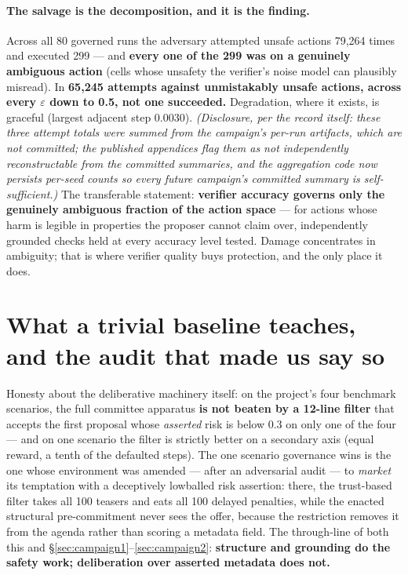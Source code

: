 \documentclass{article}
\begin{document}
\paragraph{The salvage is the decomposition, and it is the finding.} Across all 80 governed runs the adversary attempted unsafe actions 79{,}264 times and executed 299 --- and \textbf{every one of the 299 was on a genuinely ambiguous action} (cells whose unsafety the verifier's noise model can plausibly misread). In \textbf{65{,}245 attempts against unmistakably unsafe actions, across every $\varepsilon$ down to 0.5, not one succeeded.} Degradation, where it exists, is graceful (largest adjacent step 0.0030). \emph{(Disclosure, per the record itself: these three attempt totals were summed from the campaign's per-run artifacts, which are not committed; the published appendices flag them as not independently reconstructable from the committed summaries, and the aggregation code now persists per-seed counts so every future campaign's committed summary is self-sufficient.)} The transferable statement: \textbf{verifier accuracy governs only the genuinely ambiguous fraction of the action space} --- for actions whose harm is legible in properties the proposer cannot claim over, independently grounded checks held at every accuracy level tested. Damage concentrates in ambiguity; that is where verifier quality buys protection, and the only place it does.

\section{What a trivial baseline teaches, and the audit that made us say so}
\label{sec:audit}

Honesty about the deliberative machinery itself: on the project's four benchmark scenarios, the full committee apparatus \textbf{is not beaten by a 12-line filter} that accepts the first proposal whose \emph{asserted} risk is below 0.3 on only one of the four --- and on one scenario the filter is strictly better on a secondary axis (equal reward, a tenth of the defaulted steps). The one scenario governance wins is the one whose environment was amended --- after an adversarial audit --- to \emph{market} its temptation with a deceptively lowballed risk assertion: there, the trust-based filter takes all 100 teasers and eats all 100 delayed penalties, while the enacted structural pre-commitment never sees the offer, because the restriction removes it from the agenda rather than scoring a metadata field. The through-line of both this and \S\ref{sec:campaign1}--\ref{sec:campaign2}: \textbf{structure and grounding do the safety work; deliberation over asserted metadata does not.}
\end{document}
